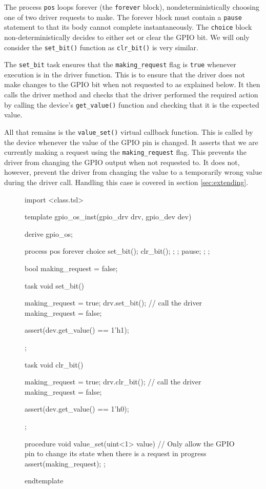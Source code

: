 \documentclass{article}
\newcommand{\code}[1]{\texttt{#1}}
\begin{document}
The process \code{pos} loops forever (the \code{forever} block), nondeterministically choosing one of two driver requests to make. The forever block must contain a \code{pause} statement to that its body cannot complete instantaneously. The \code{choice} block non-deterministically decides to either set or clear the GPIO bit. We will only consider the \code{set\_bit()} function as \code{clr\_bit()} is very similar. 

The \code{set\_bit} task ensures that the \code{making\_request} flag is \code{true} whenever execution is in the driver function. This is to ensure that the driver does not make changes to the GPIO bit when not requested to as explained below. It then calls the driver method and checks that the driver performed the required action by calling the device's \code{get\_value()} function and checking that it is the expected value.

All that remains is the \code{value\_set()} virtual callback function. This is called by the device whenever the value of the GPIO pin is changed. It asserts that we are currently making a request using the \code{making\_request} flag. This prevents the driver from changing the GPIO output when not requested to. It does not, however, prevent the driver from changing the value to a temporarily wrong value during the driver call. Handling this case is covered in section \ref{sec:extending}.

\begin{figure}[H]
\lstset{numbers=left}
\begin{tsllisting}
import <class.tsl>

template gpio_os_inst(gpio_drv drv, gpio_dev dev)

derive gpio_os;

process pos {
    forever{
        choice{       
            set_bit();
            clr_bit();
            {};      
        };
        pause;      
    };
};

bool making_request = false;

task void set_bit(){
    making_request = true;
    drv.set_bit(); // call the driver
    making_request = false;

    assert(dev.get_value() == 1'h1);
};

task void clr_bit(){
    making_request = true;
    drv.clr_bit(); // call the driver
    making_request = false;

    assert(dev.get_value() == 1'h0);
};

procedure void value_set(uint<1> value){
    // Only allow the GPIO pin to change its state when there is a request in progress
    assert(making_request);
};

endtemplate
\end{tsllisting}
\end{figure}
\end{document}
